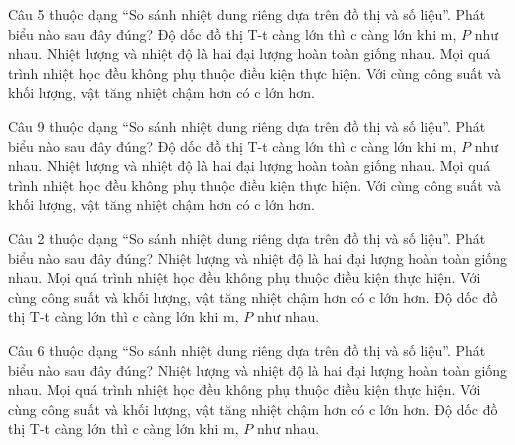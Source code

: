 \begin{ex}
Câu 5 thuộc dạng “So sánh nhiệt dung riêng dựa trên đồ thị và số liệu”. Phát biểu nào sau đây đúng?
\choice
{Độ dốc đồ thị T-t càng lớn thì c càng lớn khi m, $P$ như nhau.}
{Nhiệt lượng và nhiệt độ là hai đại lượng hoàn toàn giống nhau.}
{Mọi quá trình nhiệt học đều không phụ thuộc điều kiện thực hiện.}
{\True Với cùng công suất và khối lượng, vật tăng nhiệt chậm hơn có c lớn hơn.}
\end{ex}

\begin{ex}
Câu 9 thuộc dạng “So sánh nhiệt dung riêng dựa trên đồ thị và số liệu”. Phát biểu nào sau đây đúng?
\choice
{Độ dốc đồ thị T-t càng lớn thì c càng lớn khi m, $P$ như nhau.}
{Nhiệt lượng và nhiệt độ là hai đại lượng hoàn toàn giống nhau.}
{Mọi quá trình nhiệt học đều không phụ thuộc điều kiện thực hiện.}
{\True Với cùng công suất và khối lượng, vật tăng nhiệt chậm hơn có c lớn hơn.}
\end{ex}

\begin{ex}
Câu 2 thuộc dạng “So sánh nhiệt dung riêng dựa trên đồ thị và số liệu”. Phát biểu nào sau đây đúng?
\choice
{Nhiệt lượng và nhiệt độ là hai đại lượng hoàn toàn giống nhau.}
{Mọi quá trình nhiệt học đều không phụ thuộc điều kiện thực hiện.}
{\True Với cùng công suất và khối lượng, vật tăng nhiệt chậm hơn có c lớn hơn.}
{Độ dốc đồ thị T-t càng lớn thì c càng lớn khi m, $P$ như nhau.}
\end{ex}

\begin{ex}
Câu 6 thuộc dạng “So sánh nhiệt dung riêng dựa trên đồ thị và số liệu”. Phát biểu nào sau đây đúng?
\choice
{Nhiệt lượng và nhiệt độ là hai đại lượng hoàn toàn giống nhau.}
{Mọi quá trình nhiệt học đều không phụ thuộc điều kiện thực hiện.}
{\True Với cùng công suất và khối lượng, vật tăng nhiệt chậm hơn có c lớn hơn.}
{Độ dốc đồ thị T-t càng lớn thì c càng lớn khi m, $P$ như nhau.}
\end{ex}

